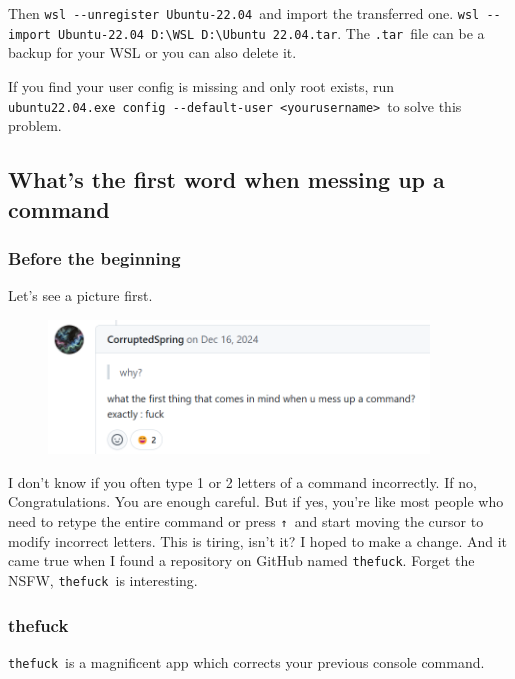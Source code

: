 \documentclass[12pt]{ctexart}
\newenvironment{mdquote}
{%
  \par\noindent
  \begin{list}{}{%
      \setlength{\leftmargin}{1em}%
      \setlength{\rightmargin}{0pt}%
      \setlength{\itemindent}{0pt}%
      \setlength{\listparindent}{\parindent}%
      \setlength{\topsep}{0.5\baselineskip}%
  }
  \item[\textbf{>}\ ]\itshape
}
{\end{list}\par}
\begin{document}
Then \texttt{wsl\ -\/-unregister\ Ubuntu-22.04}\ and import the
transferred one.
\texttt{wsl\ -\/-import\ Ubuntu-22.04\ D:\textbackslash{}WSL\ D:\textbackslash{}Ubuntu\ 22.04.tar}.
The \texttt{.tar}\ file can be a backup for your WSL or you can also
delete it.

If you find your user config is missing and only root exists, run
\texttt{ubuntu22.04.exe\ config\ -\/-default-user\ \textless{}yourusername\textgreater{}}\
to solve this problem.

\newpage
\subsection{\textbf{What's the first word when messing up a command}}

\subsubsection{\textbf{Before the beginning}}

Let's see a picture first.

\begin{figure}[H]
    \centering
    \includegraphics[width=0.9\textwidth,keepaspectratio]{assets/Linux/2.5 What's the first word when messing up a command/1.png}
\end{figure}

I don't know if you often type 1 or 2 letters of a
command incorrectly. If no, Congratulations. You are enough careful. But
if yes, you're like most people who need to retype the
entire command or press \texttt{↑}\ and start moving the cursor to modify
incorrect letters. This is tiring, isn't it? I hoped to
make a change. And it came true when I found a repository on GitHub
named \texttt{thefuck}. Forget the NSFW, \texttt{thefuck}\ is
interesting.

\subsubsection{\textbf{thefuck}}

\begin{mdquote}
\texttt{thefuck}\ is a magnificent app which corrects your previous
console command.
\end{mdquote}
\end{document}
